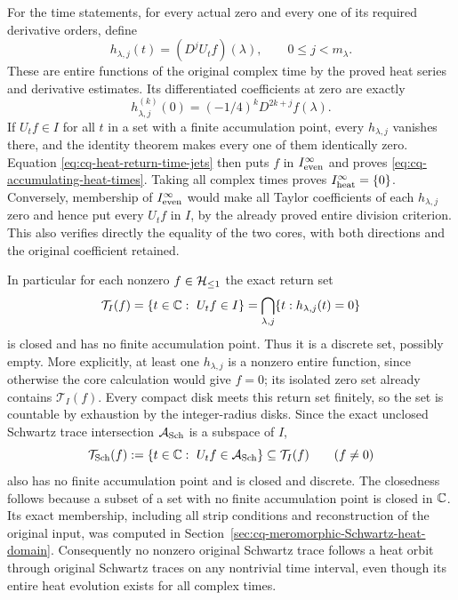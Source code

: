 For the time statements, for every actual zero and every one
of its required derivative orders, define
\[
 h_{\lambda,j}(t)=(D^jU_tf)(\lambda),
 \qquad 0\leq j<m_\lambda.
\]
These are entire functions of the original complex time by the
proved heat series and derivative estimates. Its differentiated
coefficients at zero are exactly
\begin{equation}\label{eq:cq-heat-return-time-jets}
 h_{\lambda,j}^{(k)}(0)=(-1/4)^kD^{2k+j}f(\lambda).
\end{equation}
If $U_tf\in I$ for all $t$ in a set with a finite accumulation
point, every $h_{\lambda,j}$ vanishes there, and the identity
theorem makes every one of them identically zero.
Equation \eqref{eq:cq-heat-return-time-jets} then puts $f$
in $I_{\rm even}^{\infty}$ and proves
\eqref{eq:cq-accumulating-heat-times}.
Taking all complex times proves
$I_{\rm heat}^{\infty}=\{0\}$.
Conversely, membership of $I_{\rm even}^{\infty}$ would make
all Taylor coefficients of each $h_{\lambda,j}$ zero and hence
put every $U_tf$ in $I$, by the already proved entire division
criterion. This also verifies directly the equality of the two
cores, with both directions and the original coefficient retained.

In particular for each nonzero $f\in\mathcal H_{\leq 1}$ the exact return set
\begin{equation}\label{eq:cq-heat-return-set}
 \mathcal T_I(f)=\{t\in\mathbb C:\ U_tf\in I\}
   =\bigcap_{\lambda,j}\{t:h_{\lambda,j}(t)=0\}
\end{equation}
is closed and has no finite accumulation point. Thus it is a
discrete set, possibly empty. More explicitly, at least one
$h_{\lambda,j}$ is a nonzero entire function, since otherwise
the core calculation would give $f=0$; its isolated zero set
already contains $\mathcal T_I(f)$. Every compact disk meets
this return set finitely, so the set is countable by exhaustion
by the integer-radius disks.
Since the exact unclosed Schwartz trace intersection
$\mathcal A_{\rm Sch}$ is a subspace of $I$,
\begin{equation}\label{eq:cq-Schwartz-discrete-returns}
 \mathcal T_{\rm Sch}(f)
   :=\{t\in\mathbb C:\ U_tf\in\mathcal A_{\rm Sch}\}
   \subseteq\mathcal T_I(f)
 \qquad(f\ne0)
\end{equation}
also has no finite accumulation point and is closed and
discrete. The closedness follows because a subset of a set
with no finite accumulation point is closed in $\mathbb C$.
Its exact membership, including all strip conditions and
reconstruction of the original input, was computed in
Section~\ref{sec:cq-meromorphic-Schwartz-heat-domain}.
Consequently no nonzero original Schwartz trace follows a heat
orbit through original Schwartz traces on any nontrivial time
interval, even though its entire heat evolution exists for all
complex times.

